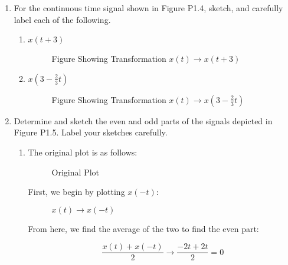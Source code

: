 \begin{enumerate}
\begin{enumerate}
    \end{enumerate}

  \item For the continuous time signal shown in Figure P1.4, sketch, and carefully label each of the following.

    \begin{enumerate}

      \item $x(t+3)$

        \begin{figure}[H]
          \centering
          
          \caption{Figure Showing Transformation $x(t)\to x(t+3)$}
          \label{fig:10}
        \end{figure}

      \item $x\left( 3-\frac{2}{3}t \right)$

        \begin{figure}[H]
          \centering
          
          \caption{Figure Showing Transformation $x(t)\to x\left( 3-\frac{2}{3}t \right)$}
          \label{fig:11}
        \end{figure}

    \end{enumerate}

  \item Determine and sketch the even and odd parts of the signals depicted in Figure P1.5. Label your sketches carefully.

    \begin{enumerate}

      \item The original plot is as follows:

        \begin{figure}[H]
          \centering
          
          \caption{Original Plot}
          \label{fig:12}
        \end{figure}

        First, we begin by plotting $x(-t)$:

        \begin{figure}[H]
          \centering
          
          \caption{$x(t)\to x(-t)$}
          \label{fig:13}
        \end{figure}

        From here, we find the average of the two to find the even part:

        $$\frac{x(t)+x(-t)}{2}\to\frac{-2t+2t}{2}=0$$


\end{enumerate}
\end{enumerate}

